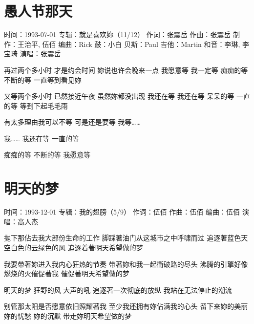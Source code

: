 \documentclass[UTF8,a4paper,oneside,twocolumn,12pt]{ctexbook}
\newcommand{\infopair}[2]{\textbullet #1：#2}
\newcommand{\zc}[1][伍佰]{\infopair{作词}{#1}}
\newcommand{\zq}[1][伍佰]{\infopair{作曲}{#1}}
\newcommand{\bq}[1][伍佰]{\infopair{编曲}{#1}}
\newcommand{\zj}[1]{\infopair{专辑}{#1}}
\newcommand{\zz}[1]{\infopair{制作}{#1}}
\newcommand{\sj}[1]{\infopair{时间}{#1}}
\newenvironment{info}{\begin{flushleft}\kaishu
	}
	{\end{flushleft}\normalsize\yahei\par}
\newenvironment{lyric}{
	}
{}
\begin{document}
\section{愚人节那天}
\begin{info}
	\sj{1993-07-01}
	\zj{就是喜欢妳（11/12）}
	\zc[张震岳]
	\zq[张震岳]
	\zz{王治平, 伍佰}
	\bq[Rick]
	\infopair{鼓}{小白}
	\infopair{贝斯}{Paul}
	\infopair{吉他}{Martin}
	\infopair{和音}{李琳, 李宝琦}
	\infopair{演唱}{张震岳}
\end{info}
\begin{lyric}
	再过两个多小时 才是约会时间
	妳说也许会晚来一点
	我愿意等
	我一定等 痴痴的等 不断的等
	一直等到看见妳

	又等两个多小时 已然接近午夜
	虽然妳都没出现
	我还在等
	我还在等 呆呆的等 一直的等
	等到下起毛毛雨

	有太多理由我可以不等
	可是还是要等
	我等……

	我……
	我还在等
	一直的等

	痴痴的等 不断的等
	我愿意等
\end{lyric}

\section{明天的梦}
\begin{info}
	\sj{1993-12-01}
	\zj{我的翅膀（5/9）}
	\zc
	\zq
	\bq
	\infopair{演唱}{高人杰}
\end{info}
\begin{lyric}
	抛下那佔去我大部份生命的工作
	脚踩著油门从这城市之中呼啸而过
	追逐著蓝色天空白色的云绿色的风
	追逐着著明天希望做的梦

	我要带著妳进入我内心狂热的节奏
	带著妳和我一起衝破路的尽头
	沸腾的引擎好像燃烧的火催促著我
	催促著明天希望做的梦

	明天的梦 狂野的风 大声的吼
	追逐著一次彻底的放纵
	我站在无法停止的潮流

	别管那太阳是否愿意依旧照耀著我
	至少我还拥有妳佔满我的心头
	留下来妳的美丽 妳的忧愁 妳的沉默
	带走妳明天希望做的梦
\end{lyric}
\end{document}

